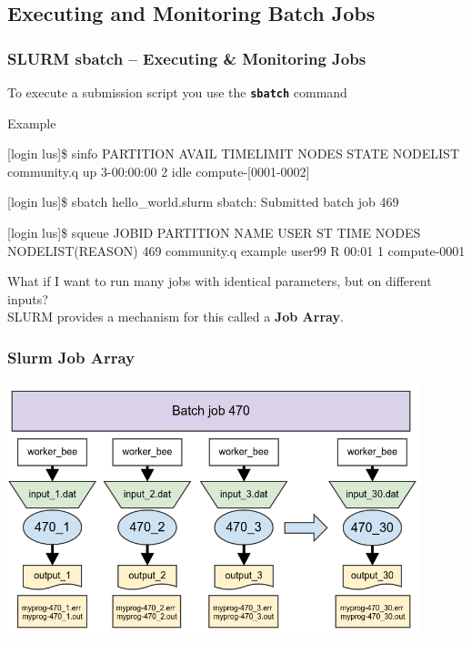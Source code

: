 \subsection{Executing and Monitoring Batch Jobs}
\begin{frame}[fragile]
\frametitle{SLURM sbatch -- Executing \& Monitoring Jobs}\footnotesize
To execute a submission script you use the \textbf{\texttt{sbatch}} command
\begin{block}{Example}
\begin{semiverbatim}\tiny
[login lus]\$ sinfo
PARTITION     AVAIL  TIMELIMIT  NODES  STATE NODELIST
community.q   up     3-00:00:00 2      idle  compute-[0001-0002]

[login lus]\$ sbatch hello_world.slurm
sbatch: Submitted batch job 469

[login lus]\$ squeue
JOBID PARTITION    NAME     USER    ST TIME  NODES  NODELIST(REASON)
469   community.q  example  user99  R  00:01 1      compute-0001
\end{semiverbatim}
\end{block}


\btVFill
\begin{center}What if I want to run many jobs with identical parameters, but on different inputs?~\\
  SLURM provides a mechanism for this called a \textbf{Job Array}.\end{center}

\end{frame}



\begin{frame}
  \frametitle{Slurm Job Array}
\begin{center}  
  \includegraphics[width=0.90\textwidth]{images/job_array}
\end{center}
\end{frame}


